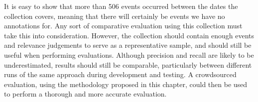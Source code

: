 It is easy to show that more than 506 events occurred between the dates the collection covers, meaning that there will certainly be events we have no annotations for.
Any sort of comparative evaluation using this collection must take this into consideration.
However, the collection should contain enough events and relevance judgements to serve as a representative sample, and should still be useful when performing evaluations.
Although precision and recall are likely to be underestimated, results should still be comparable, particularly between different runs of the same approach during development and testing.
A crowdsourced evaluation, using the methodology proposed in this chapter, could then be used to perform a thorough and more accurate evaluation.

